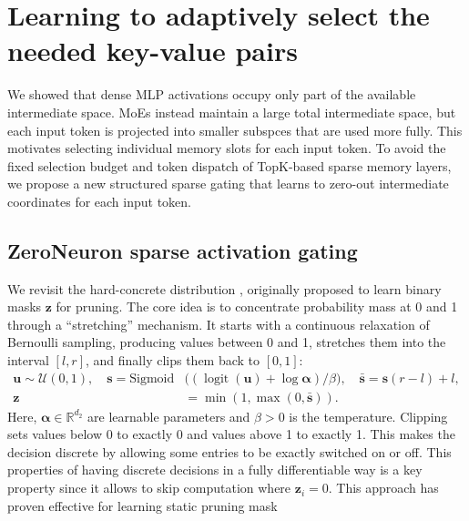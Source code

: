 \documentclass{article} %
\begin{document}



\section{Learning to adaptively select the needed key-value pairs}
\label{sec:sparse_gating}
We showed that dense MLP activations occupy only part of the available intermediate space. 
MoEs instead maintain a large total intermediate space, but each input token is projected 
into smaller subspces that are used more fully.
This motivates selecting individual memory slots for each input token. 
To avoid the fixed selection budget and token dispatch of TopK-based sparse memory layers, 
we propose a new structured sparse gating that learns to zero-out intermediate coordinates
for each input token.
\subsection{ZeroNeuron sparse activation gating}
We revisit the hard-concrete distribution \citep{louizos2018learning}, originally
proposed to learn binary masks $\mathbf{z}$ for pruning. The core idea is to concentrate probability
mass at 0 and 1 through a ``stretching'' mechanism. It starts with a continuous relaxation
of Bernoulli sampling, producing values between 0 and 1, stretches them into the
interval $[l,r]$, and finally clips them back to $[0,1]$:
\begin{align}
    \mathbf{u} \sim \mathcal{U}(0, 1), \quad \mathbf{s} = \text{Sigmoid}& \big((\operatorname{logit}(\mathbf{u}) + \log \boldsymbol{\alpha}) / \beta\big), \quad \bar{\mathbf{s}} = \mathbf{s}(r - l) + l,\\
 \mathbf{z} & = \min(1, \max(0, \bar{\mathbf{s}})). 
\end{align}
Here, $\boldsymbol{\alpha} \in \mathbb{R}^{d_2}$ are learnable parameters and $\beta>0$ is the temperature.
Clipping sets values below 0 to exactly 0 and values above 1 to exactly 1. 
This makes the decision discrete by allowing some entries to be exactly switched on or off.
This properties of having discrete decisions in a fully differentiable way is a key property
since it allows to skip computation where $\mathbf{z}_i = 0$. This approach has proven effective
for learning static pruning mask \citep{xia2024sheared, wang-etal-2020-structured}
\end{document}
